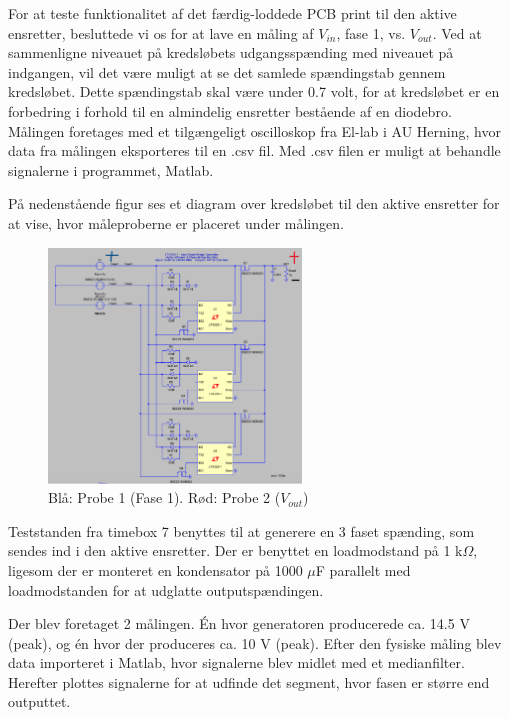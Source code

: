 For at teste funktionalitet af det færdig-loddede PCB print til den aktive ensretter, besluttede vi os for at lave en måling af $V_{in}$, fase 1, vs. $V_{out}$. Ved at sammenligne niveauet på kredsløbets udgangsspænding med niveauet på indgangen, vil det være muligt at se det samlede spændingstab gennem kredsløbet. Dette spændingstab skal være under 0.7 volt, for at kredsløbet er en forbedring i forhold til en almindelig ensretter bestående af en diodebro. 
Målingen foretages med et tilgængeligt oscilloskop fra El-lab i AU Herning, hvor data fra målingen eksporteres til en .csv fil. Med .csv filen er muligt at behandle signalerne i programmet, Matlab.

På nedenstående figur ses et diagram over kredsløbet til den aktive ensretter for at vise, hvor måleproberne er placeret under målingen.

\begin{figure}[h]
  \centering
  \includegraphics[width=0.6\textwidth]{tbil1.png}
  \caption{Blå: Probe 1 (Fase 1). Rød: Probe 2 ($V_{out}$)}
  \label{fig:jbil1}
\end{figure}

Teststanden fra timebox 7 benyttes til at generere en 3 faset spænding, som sendes ind i den aktive ensretter. Der er benyttet en loadmodstand på 1 k$\Omega$, ligesom der er monteret en kondensator på 1000 $\mu$F parallelt med loadmodstanden for at udglatte outputspændingen. 

Der blev foretaget 2 målingen. Én hvor generatoren producerede ca. 14.5 V (peak), og én hvor der produceres ca. 10 V (peak). Efter den fysiske måling blev data importeret i Matlab, hvor signalerne blev midlet med et medianfilter. Herefter plottes signalerne for at udfinde det segment, hvor fasen er større end outputtet.

